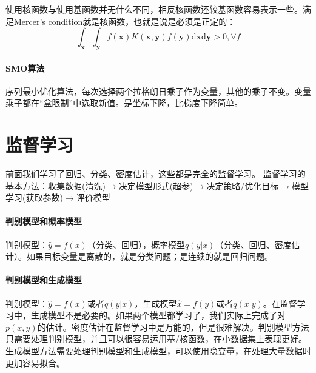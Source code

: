 使用核函数与使用基函数并无什么不同，相反核函数还较基函数容易表示一些。满足Mercer's condition就是核函数，也就是说是必须是正定的：
$$\int_{\bm x}\int_{\bm y}f(\bm x)K(\bm x, \bm y)f(\bm y)\mathrm{d}\bm x\mathrm{d}\bm y > 0, \forall f$$

\paragraph{SMO算法}
序列最小优化算法，每次选择两个拉格朗日乘子作为变量，其他的乘子不变。变量乘子都在“盒限制”中选取新值。是坐标下降，比梯度下降简单。

\section{监督学习}
前面我们学习了回归、分类、密度估计，这些都是完全的监督学习。
监督学习的基本方法：收集数据(清洗)$\rightarrow$决定模型形式(超参)$\rightarrow$决定策略/优化目标$\rightarrow$模型学习(获取参数)$\rightarrow$评价模型

\paragraph{判别模型和概率模型}
判别模型：$\hat{y} = f(x)$（分类、回归），概率模型$q(y|x)$（分类、回归、密度估计）。如果目标变量是离散的，就是分类问题；是连续的就是回归问题。

\paragraph{判别模型和生成模型}
判别模型：$\hat{y} = f(x)$或者$q(y|x)$，生成模型$\hat{x} = f(y)$或者$q(x|y)$。在监督学习中，生成模型不是必要的。如果两个模型都学习了，我们实际上完成了对$p(x,y)$的估计。密度估计在监督学习中是万能的，但是很难解决。判别模型方法只需要处理判别模型，并且可以很容易运用基/核函数，在小数据集上表现更好。生成模型方法需要处理判别模型和生成模型，可以使用隐变量，在处理大量数据时更加容易拟合。

